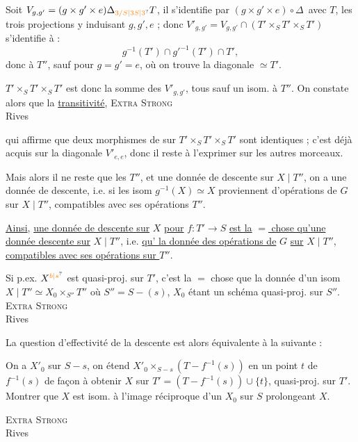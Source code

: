 Soit $V_{g,g'}=(g\times g'\times e)\Delta_{\unsure{3/S|3S|3}}T$, il s'identifie par $(g\times g'\times e)\circ\Delta$\, avec $T$, les trois projections y induisant $g,g',e$ ; donc $V'_{g,g'}=V_{g,g'}\cap(T'\times_S T'\times_S T')$ s'identifie à :
\[
g^{-1}(T')\cap {g'}^{-1}(T')\cap T',
\]
donc à $T''$, sauf pour $g=g'=e$, où on trouve la diagonale $\simeq T'$.

$T'\times_S T'\times_S T'$ est donc la somme des $V'_{g,g'}$, tous sauf un isom. à $T''$. On constate alors que la \uline{transitivité},
\textsc{Extra Strong}\\
 Rives

qui affirme  que deux morphismes de  sur $T'\times_S T'\times_S T'$ sont identiques ; c'est déjà acquis sur la diagonale $V'_{e,e}$, donc il reste à l'exprimer sur les autres morceaux.

Mais alors il ne reste que les $T''$, et    une donnée de descente   sur $X\mid T''$, on a une donnée de descente, i.e. si les isom $g^{-1}(X)\simeq X$ proviennent d'opérations de $G$ sur $X\mid T''$, compatibles avec ses opérations   $T''$.

\uline{Ainsi}, \uline{une donnée de descente sur} $X$ \uline{pour} $f:T'\to S$ \uline{est la} \uline{$=$ chose qu'une donnée  descente sur} $X\mid T''$, i.e. \uline{qu'}\uline{ la donnée des opérations de} $G$ \uline{sur} $X\mid T''$, \uline{compatibles avec ses opérations sur $T''$}.

Si p.ex. $X^{\unsure{b|s}}$ est quasi-proj. sur $T'$, c'est la $=$ chose que la donnée d'un isom $X\mid T''\simeq X_0\times_{S''}T''$ où $S''=S-(s)$, $X_0$ étant un schéma quasi-proj. sur $S''$.
\textsc{Extra Strong}\\
 Rives

La question d'effectivité de la descente est alors équivalente à la suivante :

On a $X'_0$ sur $S-s$, on étend $X'_0\times_{S-s}(T-f^{-1}(s))$ en un point $t$ de $f^{-1}(s)$ de façon à obtenir $X$ sur $T'=(T-f^{-1}(s))\cup\{t\}$, quasi-proj. sur $T'$. Montrer que $X$ est isom. à l'image réciproque d'un $X_0$ sur $S$ prolongeant $X$.

\textsc{Extra Strong}\\
 Rives
